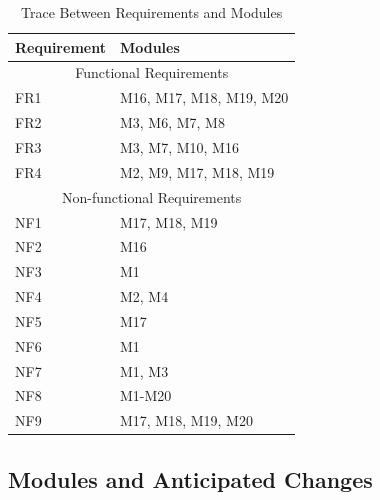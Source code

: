 \documentclass[12,english]{article}
\begin{document}
\begin{table}[!htbp]
      \begin{tabular}{ll}
        \toprule
        Requirement & Modules \\
        \midrule
        \multicolumn{2}{c}{Functional Requirements} \\
        \midrule
        FR1 & M16, M17, M18, M19, M20 \\
        FR2 & M3, M6, M7, M8 \\
        FR3 & M3, M7, M10, M16 \\
        FR4 & M2, M9, M17, M18, M19 \\
        
        \midrule
        \multicolumn{2}{c}{Non-functional Requirements} \\
        \midrule
        NF1 & M17, M18, M19 \\
        NF2 & M16 \\
        NF3 & M1 \\
        NF4 & M2, M4 \\
        NF5 & M17 \\
        NF6 & M1 \\
        NF7 & M1, M3 \\
        NF8 & M1-M20 \\
        NF9 & M17, M18, M19, M20 \\
        
        \bottomrule
        \end{tabular}
        \caption{Trace Between Requirements and Modules}
        \makeatletter
           \def\rulecolor#1#{\CT@arc{#1}}
           \def\CT@arc#1#2{%
           \ifdim\baselineskip=\z@\noalign\fi
           {\gdef\CT@arc@{\color#1{#2}}}}
           \let\CT@arc@\relax
        \makeatother
        \label{Table 2}
        \end{table}


\subsection{Modules and Anticipated Changes}
    
\end{document}
